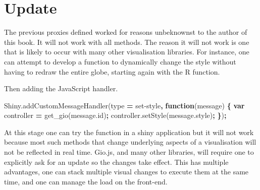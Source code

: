 \documentclass[
]{krantz}
\makeatletter
\newenvironment{Shaded}{\begin{snugshade}}{\end{snugshade}}
\newcommand{\AttributeTok}[1]{\textcolor[rgb]{0.61,0.61,0.61}{#1}}
\newcommand{\CommentTok}[1]{\textcolor[rgb]{0.37,0.37,0.37}{\textit{#1}}}
\newcommand{\ControlFlowTok}[1]{\textcolor[rgb]{0.27,0.27,0.27}{\textbf{#1}}}
\newcommand{\DataTypeTok}[1]{\textcolor[rgb]{0.27,0.27,0.27}{#1}}
\newcommand{\KeywordTok}[1]{\textcolor[rgb]{0.27,0.27,0.27}{\textbf{#1}}}
\newcommand{\NormalTok}[1]{#1}
\newcommand{\OperatorTok}[1]{\textcolor[rgb]{0.43,0.43,0.43}{\textbf{#1}}}
\newcommand{\StringTok}[1]{\textcolor[rgb]{0.5,0.5,0.5}{#1}}
\newcommand{\VariableTok}[1]{\textcolor[rgb]{0,0,0}{#1}}
\newenvironment{kframe}{%
\medskip{}
\setlength{\fboxsep}{.8em}
 \def\at@end@of@kframe{}%
 \ifinner\ifhmode%
  \def\at@end@of@kframe{\end{minipage}}%
  \begin{minipage}{\columnwidth}%
 \fi\fi%
 \def\FrameCommand##1{\hskip\@totalleftmargin \hskip-\fboxsep
 \colorbox{shadecolor}{##1}\hskip-\fboxsep
     \hskip-\linewidth \hskip-\@totalleftmargin \hskip\columnwidth}%
 \MakeFramed {\advance\hsize-\width
   \@totalleftmargin\z@ \linewidth\hsize
   \@setminipage}}%
 {\par\unskip\endMakeFramed%
 \at@end@of@kframe}
\renewenvironment{Shaded}{\begin{kframe}}{\end{kframe}}
\makeatother
\begin{document}
\hypertarget{update}{%
\section{Update}\label{update}}

The previous proxies defined worked for reasons unbeknownst to the author of this book. It will not work with all methods. The reason it will not work is one that is likely to occur with many other visualisation libraries. For instance, one can attempt to develop a function to dynamically change the style without having to redraw the entire globe, starting again with the R function.

\begin{Shaded}
\end{Shaded}

Then adding the JavaScript handler.

\begin{Shaded}
\begin{Highlighting}[]
\VariableTok{Shiny}\NormalTok{.}\AttributeTok{addCustomMessageHandler}\NormalTok{(type }\OperatorTok{=} \StringTok{\textquotesingle{}set{-}style\textquotesingle{}}\OperatorTok{,} \KeywordTok{function}\NormalTok{(message) }\OperatorTok{\{}
  \KeywordTok{var}\NormalTok{ controller }\OperatorTok{=} \AttributeTok{get\_gio}\NormalTok{(}\VariableTok{message}\NormalTok{.}\AttributeTok{id}\NormalTok{)}\OperatorTok{;}
  \VariableTok{controller}\NormalTok{.}\AttributeTok{setStyle}\NormalTok{(}\VariableTok{message}\NormalTok{.}\AttributeTok{style}\NormalTok{)}\OperatorTok{;}
\OperatorTok{\}}\NormalTok{)}\OperatorTok{;}
\end{Highlighting}
\end{Shaded}

At this stage one can try the function in a shiny application but it will not work because most such methods that change underlying aspects of a visualisation will not be reflected in real time. Gio.js, and many other libraries, will require one to explicitly ask for an update so the changes take effect. This has multiple advantages, one can stack multiple visual changes to execute them at the same time, and one can manage the load on the front-end.
\end{document}
